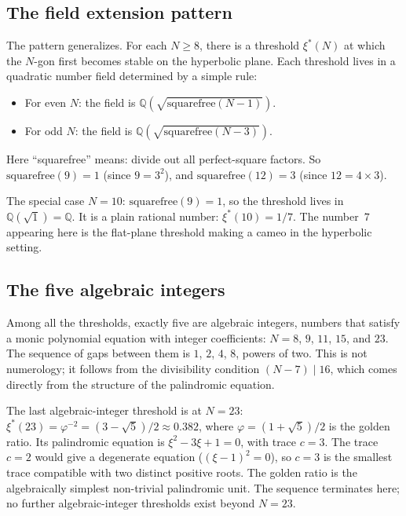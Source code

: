 \subsection*{The field extension pattern}

The pattern generalizes. For each $N \ge 8$, there is a threshold
$\xi^*(N)$ at which the $N$-gon first becomes stable on the hyperbolic
plane. Each threshold lives in a quadratic number field determined by
a simple rule:
\begin{itemize}
\item For even $N$: the field is
  $\mathbb{Q}(\sqrt{\mathrm{squarefree}(N-1)})$.
\item For odd $N$: the field is
  $\mathbb{Q}(\sqrt{\mathrm{squarefree}(N-3)})$.
\end{itemize}
Here ``squarefree'' means: divide out all perfect-square factors. So
$\mathrm{squarefree}(9) = 1$ (since $9 = 3^2$), and
$\mathrm{squarefree}(12) = 3$ (since $12 = 4 \times 3$).

The special case $N = 10$: $\mathrm{squarefree}(9) = 1$, so the
threshold lives in $\mathbb{Q}(\sqrt{1}) = \mathbb{Q}$. It is a plain
rational number: $\xi^*(10) = 1/7$. The number~$7$ appearing here is
the flat-plane threshold making a cameo in the hyperbolic setting.

\subsection*{The five algebraic integers}

Among all the thresholds, exactly five are algebraic integers, numbers
that satisfy a monic polynomial equation with integer coefficients:
$N = 8$, $9$, $11$, $15$, and $23$. The sequence of gaps between them
is $1$, $2$, $4$, $8$, powers of two. This is not numerology; it
follows from the divisibility condition $(N - 7) \mid 16$, which comes
directly from the structure of the palindromic equation.

The last algebraic-integer threshold is at $N = 23$:
$\xi^*(23) = \varphi^{-2} = (3 - \sqrt{5})/2 \approx 0.382$,
where $\varphi = (1 + \sqrt{5})/2$ is the golden ratio. Its
palindromic equation is $\xi^2 - 3\xi + 1 = 0$, with trace $c = 3$.
The trace $c = 2$ would give a degenerate equation ($(\xi - 1)^2 = 0$),
so $c = 3$ is the smallest trace compatible with two distinct positive
roots. The golden ratio is the algebraically simplest non-trivial
palindromic unit. The sequence terminates here; no further
algebraic-integer thresholds exist beyond $N = 23$.

